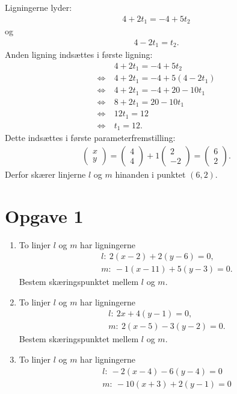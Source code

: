 \begin{exa}
	Ligningerne lyder:
	\begin{align*}
		4 + 2t_1 = -4+5t_2
	\end{align*} og
	\begin{align*}
		4-2t_1 = t_2.
	\end{align*}
	Anden ligning indsættes i første ligning:
	\begin{align*}
		&4 + 2t_1 = -4+5t_2\\
		\Leftrightarrow \ &4 + 2t_1 = -4+5(4-2t_1)\\
		\Leftrightarrow \ &4+2t_1 = -4+20-10t_1\\
		\Leftrightarrow \ &8+2t_1 = 20-10t_1\\
		\Leftrightarrow \ &12t_1 = 12\\
		\Leftrightarrow \ &t_1 = 12.
	\end{align*}
	Dette indsættes i første parameterfremstilling:
	\begin{align*}
		\begin{pmatrix}
			x \\ y
		\end{pmatrix} = 
		\begin{pmatrix}
			4 \\ 4 
		\end{pmatrix} 
		+ 1
		\begin{pmatrix}
			2 \\ -2
		\end{pmatrix} = 
		\begin{pmatrix}
			6 \\ 2
		\end{pmatrix}.
	\end{align*}
	Derfor skærer linjerne $l$ og $m$ hinanden i punktet $(6,2)$. 
\end{exa}

\section*{Opgave 1}
\begin{enumerate}[label=\roman*)]
	\item To linjer $l$ og $m$ har ligningerne
	\begin{align*}
		&l: \ 2(x-2) + 2(y-6) = 0,\\
		&m: \ -1(x-11) + 5(y-3) = 0.
	\end{align*}
	Bestem skæringspunktet mellem $l$ og $m$. 
	\item To linjer $l$ og $m$ har ligningerne 
	\begin{align*}
		&l: \ 2x + 4(y-1) = 0,\\
		&m: \ 2(x-5) -3(y-2) = 0.
	\end{align*}
	Bestem skæringspunktet mellem $l$ og $m$.
	\item To linjer $l$ og $m$ har ligningerne 
	\begin{align*}
		&l: \ -2(x-4) -6(y-4) = 0\\
		&m: \ -10(x+3) +2(y-1) = 0
	\end{align*}
\end{enumerate}

